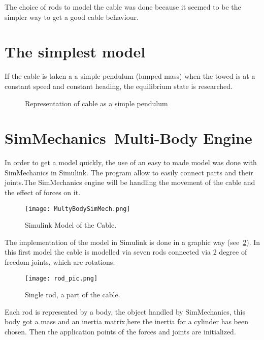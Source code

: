 The choice of rods to model the cable was done because it seemed to be the simpler
way to get a good cable behaviour.


\section{The simplest model}

If the cable is taken a a simple pendulum (lumped mass) when the towed is at a constant speed 
and constant heading, the equilibrium state is researched.


\begin{figure}[H]
\centering
{} %
{

}
\caption{Representation of cable as a simple pendulum}
\label{fig:model_pendulum}
\end{figure}


\section{SimMechanics\texttrademark ~Multi-Body Engine}

In order to get a model quickly, the use of an easy to made model was done with SimMechanics in Simulink.
The program allow to easily connect parts and their joints.The SimMechanics engine will be handling the movement of the cable and the effect of forces on it.

\begin{figure}[H]
\centering
    \texttt{[image: MultyBodySimMech.png]}
    \caption{Simulink Model of the Cable.}
    \label{fig:SimulinkFullMod}
\end{figure}

The implementation of the model in Simulink is done in a graphic way (see~\ref{fig:SimulinkFullMod}). In
this first model the cable is modelled via seven rods connected via 2 degree of freedom joints, which are rotations.

\begin{figure}[H]
\centering
    \texttt{[image: rod\_pic.png]}
    \caption{Single rod, a part of the cable.}
    \label{fig:SingleRod}
\end{figure}

Each rod is represented by a body, the object handled by SimMechanics, this body got a mass and an inertia matrix,here the inertia for a cylinder has been chosen. Then the application points of the forces and joints are
initialized.

